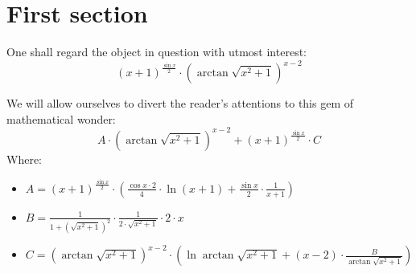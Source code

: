 \documentclass{article}
\begin{document}
\maketitle
\newpage
\section{First section}

One shall regard the object in question with utmost interest:
\begin{equation}
\left( x + 1 \right) ^{\frac{\sin x }{2 } } \cdot \left( \arctan \sqrt {x ^{2 } + 1 } \right) ^{x - 2 } 
\end{equation}

We will allow ourselves to divert the reader's attentions to this gem of mathematical wonder:
\begin{equation}
A \cdot \left( \arctan \sqrt {x ^{2 } + 1 } \right) ^{x - 2 } + \left( x + 1 \right) ^{\frac{\sin x }{2 } } \cdot C 
\end{equation}
Where:
\begin{itemize}
	\item $A = \left( x + 1 \right) ^{\frac{\sin x }{2 } } \cdot \left( \frac{\cos x \cdot 2 }{4 } \cdot \ln \left( x + 1 \right) + \frac{\sin x }{2 } \cdot \frac{1 }{x + 1 } \right) $
	\item $B = \frac{1 }{1 + \left( \sqrt {x ^{2 } + 1 } \right) ^{2 } } \cdot \frac{1 }{2 \cdot \sqrt {x ^{2 } + 1 } } \cdot 2 \cdot x $
	\item $C = \left( \arctan \sqrt {x ^{2 } + 1 } \right) ^{x - 2 } \cdot \left( \ln \arctan \sqrt {x ^{2 } + 1 } + \left( x - 2 \right) \cdot \frac{B }{\arctan \sqrt {x ^{2 } + 1 } } \right) $
\end{itemize}
\end{document}
